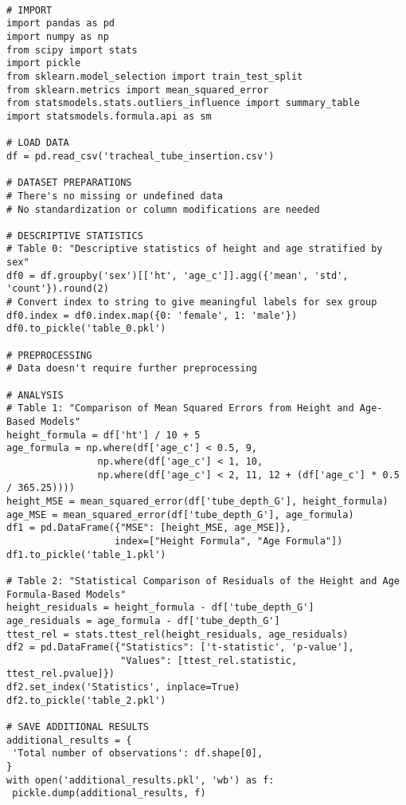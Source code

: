 \documentclass[11pt]{article}
\begin{document}
\begin{verbatim}

# IMPORT
import pandas as pd
import numpy as np
from scipy import stats
import pickle
from sklearn.model_selection import train_test_split
from sklearn.metrics import mean_squared_error
from statsmodels.stats.outliers_influence import summary_table
import statsmodels.formula.api as sm

# LOAD DATA
df = pd.read_csv('tracheal_tube_insertion.csv')

# DATASET PREPARATIONS
# There's no missing or undefined data
# No standardization or column modifications are needed

# DESCRIPTIVE STATISTICS
# Table 0: "Descriptive statistics of height and age stratified by sex"
df0 = df.groupby('sex')[['ht', 'age_c']].agg({'mean', 'std', 'count'}).round(2)
# Convert index to string to give meaningful labels for sex group
df0.index = df0.index.map({0: 'female', 1: 'male'})
df0.to_pickle('table_0.pkl')

# PREPROCESSING
# Data doesn't require further preprocessing    

# ANALYSIS
# Table 1: "Comparison of Mean Squared Errors from Height and Age-Based Models"
height_formula = df['ht'] / 10 + 5
age_formula = np.where(df['age_c'] < 0.5, 9, 
                np.where(df['age_c'] < 1, 10, 
                np.where(df['age_c'] < 2, 11, 12 + (df['age_c'] * 0.5 / 365.25))))
height_MSE = mean_squared_error(df['tube_depth_G'], height_formula)
age_MSE = mean_squared_error(df['tube_depth_G'], age_formula)
df1 = pd.DataFrame({"MSE": [height_MSE, age_MSE]}, 
                   index=["Height Formula", "Age Formula"])
df1.to_pickle('table_1.pkl')

# Table 2: "Statistical Comparison of Residuals of the Height and Age Formula-Based Models"
height_residuals = height_formula - df['tube_depth_G']
age_residuals = age_formula - df['tube_depth_G']
ttest_rel = stats.ttest_rel(height_residuals, age_residuals)
df2 = pd.DataFrame({"Statistics": ['t-statistic', 'p-value'], 
                    "Values": [ttest_rel.statistic, ttest_rel.pvalue]})
df2.set_index('Statistics', inplace=True)
df2.to_pickle('table_2.pkl')

# SAVE ADDITIONAL RESULTS
additional_results = {
 'Total number of observations': df.shape[0], 
}
with open('additional_results.pkl', 'wb') as f:
 pickle.dump(additional_results, f)

\end{verbatim}
\end{document}

